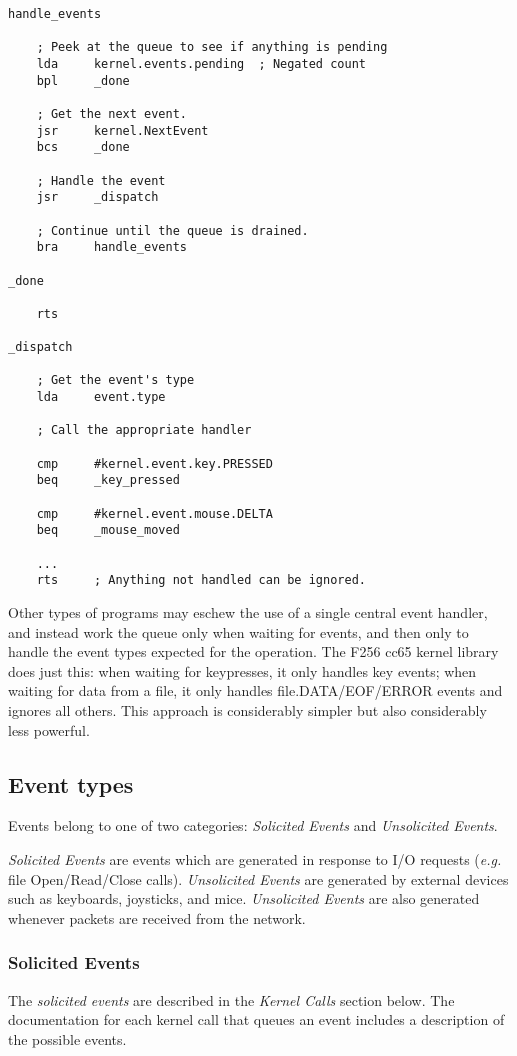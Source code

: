\begin{verbatim}
handle_events

    ; Peek at the queue to see if anything is pending
    lda		kernel.events.pending  ; Negated count
    bpl		_done

    ; Get the next event.
    jsr		kernel.NextEvent
    bcs		_done

    ; Handle the event
    jsr		_dispatch
            
    ; Continue until the queue is drained.
    bra		handle_events
            
_done

    rts

_dispatch

    ; Get the event's type
    lda		event.type
    					
    ; Call the appropriate handler

    cmp		#kernel.event.key.PRESSED
    beq		_key_pressed

    cmp		#kernel.event.mouse.DELTA
    beq		_mouse_moved
			
    ...
    rts     ; Anything not handled can be ignored.
\end{verbatim}

Other types of programs may eschew the use of a single central event handler, and instead work the queue only when waiting for events, and then only to handle the event types expected for the operation.  The F256 cc65 kernel library does just this: when waiting for keypresses, it only handles key events; when waiting for data from a file, it only handles file.DATA/EOF/ERROR events and ignores all others.  This approach is considerably simpler but also considerably less powerful.

\subsection*{Event types}
Events belong to one of two categories: {\em Solicited Events} and {\em Unsolicited Events}.

{\em Solicited Events} are events which are generated in response to I/O requests ({\it e.g.} file Open/Read/Close calls).  {\em Unsolicited Events} are generated by external devices such as keyboards, joysticks, and mice.  {\em Unsolicited Events} are also generated whenever packets are received from the network.

\subsubsection*{Solicited Events}
The {\em solicited events} are described in the {\em Kernel Calls} section below.  The documentation for each kernel call that queues an event includes a description of the possible events.


